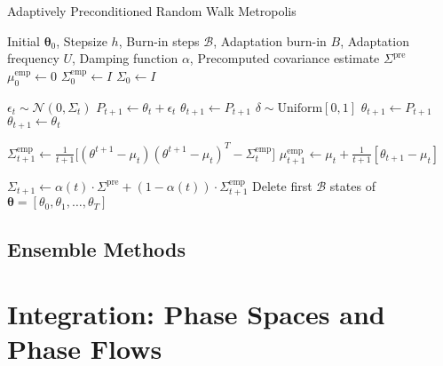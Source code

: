 \documentclass{article}
\theoremstyle{remark}
\theoremstyle{definition}
\begin{document}
\begin{algorithm}
\caption{Adaptively Preconditioned Random Walk Metropolis}\label{alg:cap}
\begin{algorithmic}

\Require Initial $\boldsymbol{\theta}_0$, Stepsize $h$, Burn-in steps $\mathcal{B}$, Adaptation burn-in $B$, Adaptation frequency $U$, Damping function $\alpha$, Precomputed covariance estimate $\Sigma^{\mathrm{pre}}$
\State $\mu_0^\mathrm{emp} \gets 0$ 
\State $\Sigma^\mathrm{emp}_0 \gets I$
\State $\Sigma_0 \gets I$

    \State $\epsilon_t \sim \mathcal{N}(0, \Sigma_t)$ 
    \State $P_{t+1} \gets \theta_t + \epsilon_t$
        \State $\theta_{t+1} \gets P_{t+1}$ 
    \Else
        \State $\delta \sim \mathrm{Uniform}[0, 1]$
            \State $\theta_{t+1} \gets P_{t+1}$ 
        \Else 
            \State $\theta_{t+1} \gets \theta_t$
        \EndIf
    \EndIf
    
    \State $\Sigma^\mathrm{emp}_{t+1} \gets \frac{1}{t+1} \big[(\theta^{t+1} - \mu_t) (\theta^{t+1} - \mu_t)^T - \Sigma^\mathrm{emp}_t \big]$
    \State $\mu_{t+1}^\mathrm{emp} \gets \mu_t + \frac{1}{t+1} [ \theta_{t+1} - \mu_t ]$
    
        \State $\Sigma_{t+1} \gets \alpha(t) \cdot \Sigma^\mathrm{pre} + (1 - \alpha(t)) \cdot \Sigma^\mathrm{emp}_{t+1}$
    \EndIf
\EndFor
\State Delete first $\mathcal{B}$ states of $\boldsymbol{\theta} = [\theta_0, \theta_1, \ldots, \theta_T]$

\end{algorithmic}
\end{algorithm}

\subsection{Ensemble Methods}

\pagebreak

\section{Integration: Phase Spaces and Phase Flows}
\end{document}
